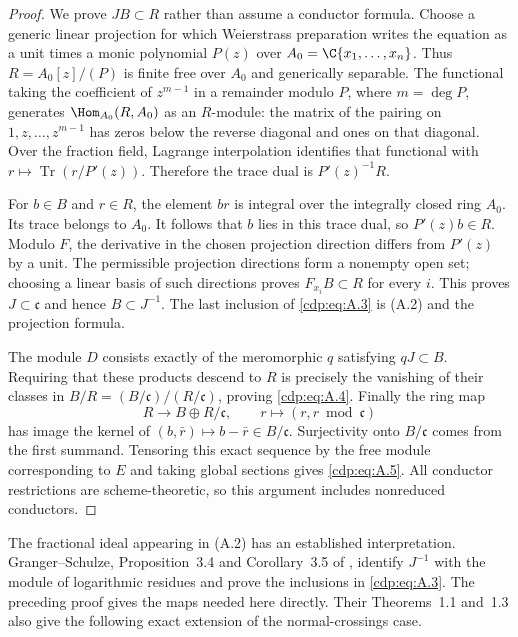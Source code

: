 \begin{proof}
We prove $JB\subset R$ rather than assume a conductor formula. Choose a generic linear projection for which Weierstrass preparation writes the equation as a unit times a monic polynomial $P(z)$ over $A_0=\C\{x_1,\ldots,x_n\}$. Thus $R=A_0[z]/(P)$ is finite free over $A_0$ and generically separable. The functional taking the coefficient of $z^{m-1}$ in a remainder modulo $P$, where $m=\deg P$, generates $\Hom_{A_0}(R,A_0)$ as an $R$-module: the matrix of the pairing on $1,z,\ldots,z^{m-1}$ has zeros below the reverse diagonal and ones on that diagonal. Over the fraction field, Lagrange interpolation identifies that functional with $r\mapsto\operatorname{Tr}(r/P'(z))$. Therefore the trace dual is $P'(z)^{-1}R$.

For $b\in B$ and $r\in R$, the element $br$ is integral over the integrally closed ring $A_0$. Its trace belongs to $A_0$. It follows that $b$ lies in this trace dual, so $P'(z)b\in R$. Modulo $F$, the derivative in the chosen projection direction differs from $P'(z)$ by a unit. The permissible projection directions form a nonempty open set; choosing a linear basis of such directions proves $F_{x_i}B\subset R$ for every $i$. This proves $J\subset\mathfrak c$ and hence $B\subset J^{-1}$. The last inclusion of \eqref{cdp:eq:A.3} is (A.2) and the projection formula.

The module $D$ consists exactly of the meromorphic $q$ satisfying $qJ\subset B$. Requiring that these products descend to $R$ is precisely the vanishing of their classes in $B/R=(B/\mathfrak c)/(R/\mathfrak c)$, proving \eqref{cdp:eq:A.4}. Finally the ring map
\[
 R\longrightarrow B\oplus R/\mathfrak c,
 \qquad r\longmapsto(r,r\bmod\mathfrak c)
\]
has image the kernel of $(b,\bar r)\mapsto b-\bar r\in B/\mathfrak c$. Surjectivity onto $B/\mathfrak c$ comes from the first summand. Tensoring this exact sequence by the free module corresponding to $E$ and taking global sections gives \eqref{cdp:eq:A.5}. All conductor restrictions are scheme-theoretic, so this argument includes nonreduced conductors.
\end{proof}

The fractional ideal appearing in (A.2) has an established interpretation. Granger--Schulze, Proposition~3.4 and Corollary~3.5 of \cite{GS2014}, identify $J^{-1}$ with the module of logarithmic residues and prove the inclusions in \eqref{cdp:eq:A.3}. The preceding proof gives the maps needed here directly. Their Theorems~1.1 and~1.3 also give the following exact extension of the normal-crossings case.



